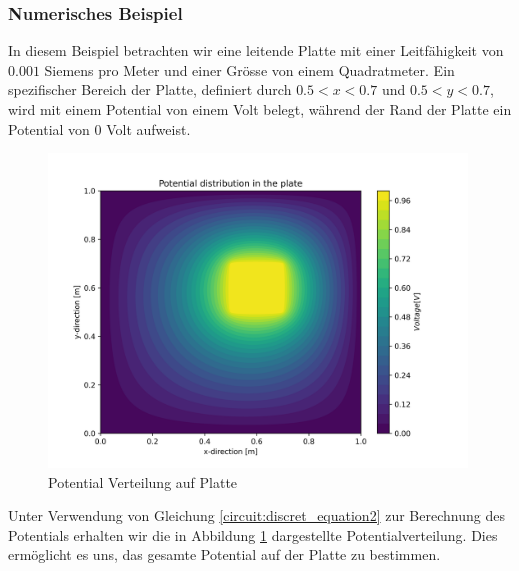 \subsubsection{Numerisches Beispiel}
In diesem Beispiel betrachten wir eine leitende Platte mit einer Leitfähigkeit von $0.001$ Siemens pro Meter und einer Grösse von einem Quadratmeter. Ein spezifischer Bereich der Platte, definiert durch $0.5 < x < 0.7$ und $0.5 < y < 0.7$, wird mit einem Potential von einem Volt belegt, während der Rand der Platte ein Potential von 0 Volt aufweist.
\begin{figure}
	\centering
	\includegraphics[width=0.99\textwidth]{papers/circuit/potential_distribution.png}
	\caption{Potential Verteilung auf Platte}
	\label{fig:potential_distribution}
\end{figure}
Unter Verwendung von Gleichung \ref{circuit:discret_equation2} zur Berechnung des Potentials erhalten wir die in Abbildung \ref{fig:potential_distribution} dargestellte Potentialverteilung. Dies ermöglicht es uns, das gesamte Potential auf der Platte zu bestimmen.

